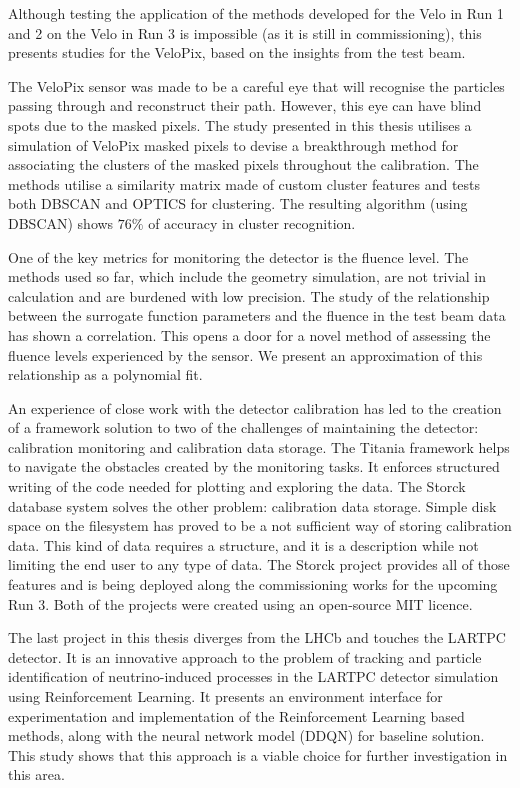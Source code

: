 Although testing the application of the methods developed for the Velo in Run 1 and 2 on the Velo in Run 3 is impossible (as it is still in commissioning), this presents studies for the VeloPix, based on the insights from the test beam.

The VeloPix sensor was made to be a careful eye that will recognise the particles passing through and reconstruct their path.
However, this eye can have blind spots due to the masked pixels.
The study presented in this thesis utilises a simulation of VeloPix masked pixels to devise a breakthrough method for associating the clusters of the masked pixels throughout the calibration.
The methods utilise a similarity matrix made of custom cluster features and tests both DBSCAN and OPTICS for clustering.
The resulting algorithm (using DBSCAN) shows $76\%$ of accuracy in cluster recognition.

One of the key metrics for monitoring the detector is the fluence level.
The methods used so far, which include the geometry simulation, are not trivial in calculation and are burdened with low precision.
The study of the relationship between the surrogate function parameters and the fluence in the test beam data has shown a correlation. 
This opens a door for a novel method of assessing the fluence levels experienced by the sensor.
We present an approximation of this relationship as a polynomial fit.


An experience of close work with the detector calibration has led to the creation of a framework solution to two of the challenges of maintaining the detector: calibration monitoring and calibration data storage.
The Titania framework helps to navigate the obstacles created by the monitoring tasks.
It enforces structured writing of the code needed for plotting and exploring the data.
The Storck database system solves the other problem: calibration data storage.
Simple disk space on the filesystem has proved to be a not sufficient way of storing calibration data. 
This kind of data requires a structure, and it is a description while not limiting the end user to any type of data.
The Storck project provides all of those features and is being deployed along the commissioning works for the upcoming Run 3.
Both of the projects were created using an open-source MIT licence.


The last project in this thesis diverges from the LHCb and touches the LARTPC detector.
It is an innovative approach to the problem of tracking and particle identification of neutrino-induced processes in the LARTPC detector simulation using Reinforcement Learning. 
It presents an environment interface for experimentation and implementation of the Reinforcement Learning based methods, along with the neural network model (DDQN) for baseline solution.
This study shows that this approach is a viable choice for further investigation in this area.



